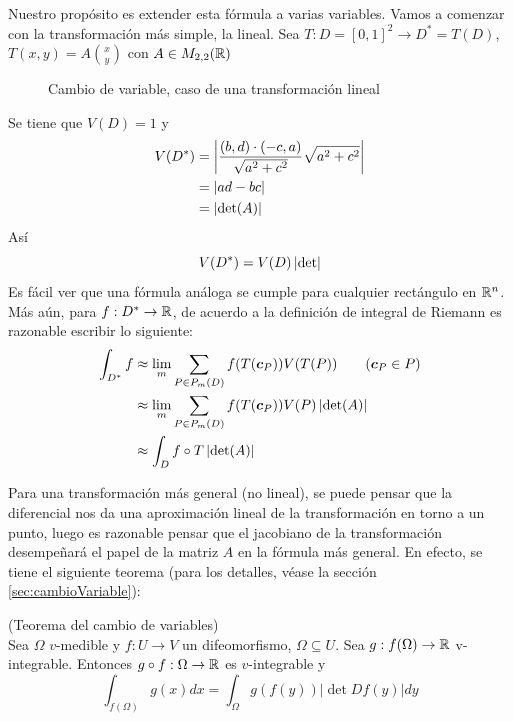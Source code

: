 Nuestro prop\'osito es extender esta f\'ormula a varias variables. Vamos a comenzar con la transformaci\'on m\'as simple, la lineal. Sea $T:D=[0,1]^2 \to D^*=T(D) $, $ T(x,y) = A \binom{x}{y} $ con $ A \in M_{2,2}(\mathbb{R}) $

\begin{figure}[H]
	\centering
	
	\caption{Cambio de variable, caso de una transformaci\'on lineal}
\end{figure}

Se tiene que $ V(D) = 1 $ y
\begin{align*}
    V(D^*) &= \left\lvert\frac{(b,d) \cdot (-c,a)}{\sqrt{a^2+c^2}}
    \sqrt{a^2+c^2}\right\rvert \\
    &= \left\lvert ad-bc\right\rvert \\
    &= \left\lvert\det(A)\right\rvert
\end{align*}
As\'i
\[ V(D^*) = V(D) \left\lvert\det\right\rvert\]
Es f\'acil ver que una f\'ormula an\'aloga se cumple para cualquier rect\'angulo en $ \mathbb{R}^n $. M\'as a\'un, para  $ f:D^* \to \mathbb{R} $, de acuerdo a la definici\'on de integral de Riemann es razonable escribir lo siguiente:
\begin{align*}
\int_{D^*} f
    &\approx \lim_m \sum_{P \in P_{m}(D)} f(T(\boldsymbol{c}_P)) V(T(P))
        \qquad (\boldsymbol{c}_P \in P)\\
    &\approx \lim_m \sum_{P \in P_{m}(D)} f(T(\boldsymbol{c}_P)) V(P)
    \left\lvert\det(A)\right\rvert  \\
    &\approx \int_D f \circ T \left\lvert\det(A)\right\rvert
\end{align*}

Para una transformaci\'on m\'as general (no lineal), se puede pensar que la diferencial nos da una aproximaci\'on lineal de la transformaci\'on en torno a un punto, luego es razonable pensar que el jacobiano de la transformaci\'on desempe\~nar\'a el papel de la matriz $ A $ en la f\'ormula m\'as general. En efecto, se tiene el siguiente teorema (para los detalles, v\'ease la secci\'on
\ref{sec:cambioVariable}):

\begin{teorema}{\rm (Teorema del cambio de variables) }
\\Sea $\Omega$ $v$-medible y $f:U\to V$ un difeomorfismo,
$\Omega\subseteq U$. Sea $g:f(\Omega)\to \mathbb{R}$ v-integrable.
Entonces $g\circ f:\Omega \to \mathbb{R}$ es $v$-integrable y
\[\int_{f(\Omega)}g(x)dx=\int_{\Omega}g(f(y))|\det Df(y)|dy\]
\end{teorema}

